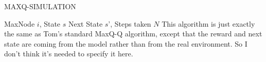 \begin{algorithm}[t]
\caption{MAXQ-SIMULATION} \label{fig:MaxQSimulation}
\begin{algorithmic}[1]
\REQUIRE MaxNode $i$, State $s$
\ENSURE Next State $s$', Steps taken $N$
\STATE This algorithm is just exactly the same as Tom's standard MaxQ-Q algorithm, except that the reward and next state are coming from the model rather than from the real environment. So I don't think it's needed to specify it here. 
\end{algorithmic}
\end{algorithm} 




















